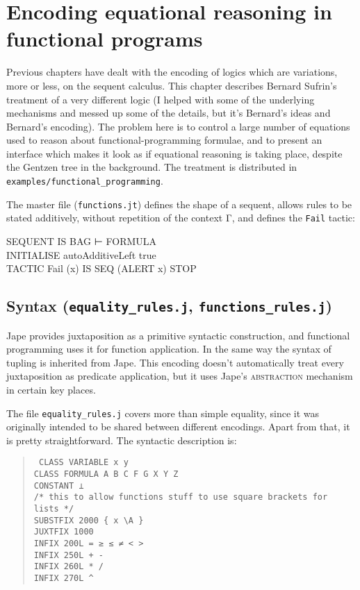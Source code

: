 \chapter{Encoding equational reasoning in functional programs}
\label{chap:funcprog}

Previous chapters have dealt with the encoding of logics which are variations, more or less, on the sequent calculus. This chapter describes Bernard Sufrin's treatment of a very different logic (I helped with some of the underlying mechanisms and messed up some of the details, but it's Bernard's ideas and Bernard's encoding). The problem here is to control a large number of equations used to reason about functional-programming formulae, and to present an interface which makes it look as if equational reasoning is taking place, despite the Gentzen tree in the background. The treatment is distributed in \texttt{examples/functional\_programming}.

The master file (\texttt{functions.jt}) defines the shape of a sequent, allows rules to be stated additively, without repetition of the context Γ, and defines the \texttt{Fail} tactic:
\begin{japeish}
SEQUENT IS BAG ⊢ FORMULA \\
INITIALISE autoAdditiveLeft true \\
TACTIC Fail (x) IS SEQ (ALERT x) STOP
\end{japeish}

\section{Syntax (\texttt{equality\_rules.j}, \texttt{functions\_rules.j})}

Jape provides juxtaposition as a primitive syntactic construction, and functional programming uses it for function application. In the same way the syntax of tupling is inherited from Jape. This encoding doesn't automatically treat every juxtaposition as predicate application, but it uses Jape's \textsc{abstraction} mechanism in certain key places.

The file \texttt{equality\_rules.j} covers more than simple equality, since it was originally intended to be shared between different encodings. Apart from that, it is pretty straightforward. The syntactic description is:
\begin{quote}\tt\small
CLASS VARIABLE x y \\
CLASS FORMULA A B C F G X Y Z \\
CONSTANT ⊥ \\
 
/* this to allow functions stuff to use square brackets for lists */ \\
SUBSTFIX    2000 \{ x \textbackslash A \} \\
JUXTFIX 1000 \\
INFIX       200L    = ≥ ≤ ≠ < > \\
INFIX       250L    + - \\
INFIX       260L    * / \\
INFIX       270L    \textasciicircum \\
\end{quote}

